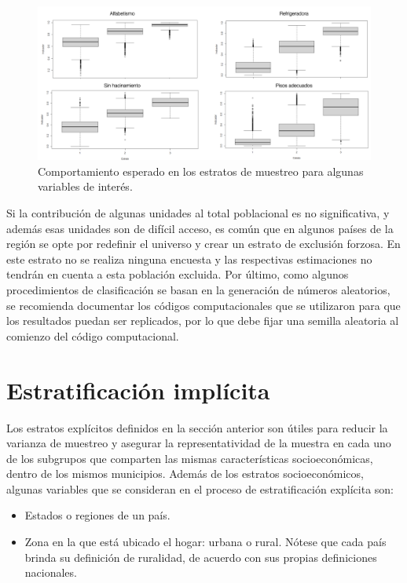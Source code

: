 \documentclass[
  12pt,
]{book}
\providecommand{\tightlist}{%
  \setlength{\itemsep}{0pt}\setlength{\parskip}{0pt}}
\begin{document}
\begin{figure}
\includegraphics[width=800px]{Pics/Estratificar} \caption{Comportamiento esperado en los estratos de muestreo para algunas variables de interés.}\label{fig:estrata}
\end{figure}

Si la contribución de algunas unidades al total poblacional es no significativa, y además esas unidades son de difícil acceso, es común que en algunos países de la región se opte por redefinir el universo y crear un estrato de exclusión forzosa. En este estrato no se realiza ninguna encuesta y las respectivas estimaciones no tendrán en cuenta a esta población excluida. Por último, como algunos procedimientos de clasificación se basan en la generación de números aleatorios, se recomienda documentar los códigos computacionales que se utilizaron para que los resultados puedan ser replicados, por lo que debe fijar una semilla aleatoria al comienzo del código computacional.

\hypertarget{estratificaciuxf3n-impluxedcita}{%
\section{Estratificación implícita}\label{estratificaciuxf3n-impluxedcita}}

Los estratos explícitos definidos en la sección anterior son útiles para reducir la varianza de muestreo y asegurar la representatividad de la muestra en cada uno de los subgrupos que comparten las mismas características socioeconómicas, dentro de los mismos municipios. Además de los estratos socioeconómicos, algunas variables que se consideran en el proceso de estratificación explícita son:

\begin{itemize}
\tightlist
\item
  Estados o regiones de un país.
\item
  Zona en la que está ubicado el hogar: urbana o rural. Nótese que cada país brinda su definición de ruralidad, de acuerdo con sus propias definiciones nacionales.
\end{itemize}
\end{document}
